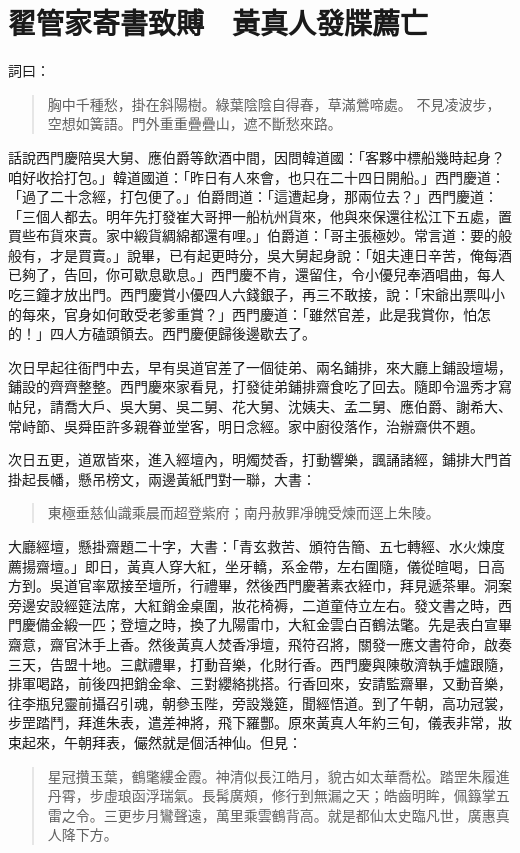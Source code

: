 
\chapter{翟管家寄書致賻　黃真人發牒薦亡}

詞曰：
\begin{quote}
胸中千種愁，掛在斜陽樹。綠葉陰陰自得春，草滿鶯啼處。
不見凌波步，空想如簧語。門外重重疊疊山，遮不斷愁來路。
\end{quote}

話說西門慶陪吳大舅、應伯爵等飲酒中間，因問韓道國：「客夥中標船幾時起身？咱好收拾打包。」韓道國道：「昨日有人來會，也只在二十四日開船。」西門慶道：「過了二十念經，打包便了。」伯爵問道：「這遭起身，那兩位去？」西門慶道：「三個人都去。明年先打發崔大哥押一船杭州貨來，他與來保還往松江下五處，置買些布貨來賣。家中緞貨綢綿都還有哩。」伯爵道：「哥主張極妙。常言道：要的般般有，才是買賣。」說畢，已有起更時分，吳大舅起身說：「姐夫連日辛苦，俺每酒已夠了，告回，你可歇息歇息。」西門慶不肯，還留住，令小優兒奉酒唱曲，每人吃三鐘才放出門。西門慶賞小優四人六錢銀子，再三不敢接，說：「宋爺出票叫小的每來，官身如何敢受老爹重賞？」西門慶道：「雖然官差，此是我賞你，怕怎的！」四人方磕頭領去。西門慶便歸後邊歇去了。

次日早起往衙門中去，早有吳道官差了一個徒弟、兩名鋪排，來大廳上鋪設壇場，鋪設的齊齊整整。西門慶來家看見，打發徒弟鋪排齋食吃了回去。隨即令溫秀才寫帖兒，請喬大戶、吳大舅、吳二舅、花大舅、沈姨夫、孟二舅、應伯爵、謝希大、常峙節、吳舜臣許多親眷並堂客，明日念經。家中廚役落作，治辦齋供不題。

次日五更，道眾皆來，進入經壇內，明燭焚香，打動響樂，諷誦諸經，鋪排大門首掛起長幡，懸吊榜文，兩邊黃紙門對一聯，大書：
\begin{quote}
東極垂慈仙識乘晨而超登紫府；南丹赦罪凈魄受煉而逕上朱陵。
\end{quote}

大廳經壇，懸掛齋題二十字，大書：「青玄救苦、頒符告簡、五七轉經、水火煉度薦揚齋壇。」即日，黃真人穿大紅，坐牙轎，系金帶，左右圍隨，儀從暄喝，日高方到。吳道官率眾接至壇所，行禮畢，然後西門慶著素衣絰巾，拜見遞茶畢。洞案旁邊安設經筵法席，大紅銷金桌圍，妝花椅褥，二道童侍立左右。發文書之時，西門慶備金緞一匹；登壇之時，換了九陽雷巾，大紅金雲白百鶴法氅。先是表白宣畢齋意，齋官沐手上香。然後黃真人焚香凈壇，飛符召將，關發一應文書符命，啟奏三天，告盟十地。三獻禮畢，打動音樂，化財行香。西門慶與陳敬濟執手爐跟隨，排軍喝路，前後四把銷金傘、三對纓絡挑搭。行香回來，安請監齋畢，又動音樂，往李瓶兒靈前攝召引魂，朝參玉陛，旁設幾筵，聞經悟道。到了午朝，高功冠裳，步罡踏鬥，拜進朱表，遣差神將，飛下羅酆。原來黃真人年約三旬，儀表非常，妝束起來，午朝拜表，儼然就是個活神仙。但見：
\begin{quote}
星冠攢玉葉，鶴氅縷金霞。神清似長江皓月，貌古如太華喬松。踏罡朱履進丹霄，步虛琅函浮瑞氣。長髯廣頰，修行到無漏之天；皓齒明眸，佩籙掌五雷之令。三更步月鸞聲遠，萬里乘雲鶴背高。就是都仙太史臨凡世，廣惠真人降下方。
\end{quote}

